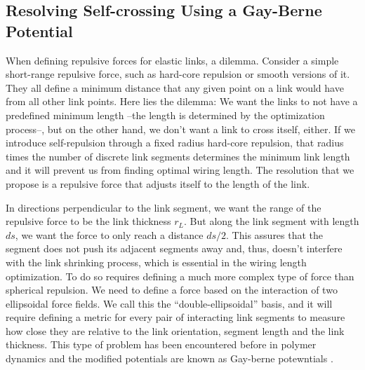 \documentclass[endfloats,nofootinbib,preprint,floatfix,titlepage,superscriptaddress]{revtex4} %
\begin{document}
\subsection{Resolving Self-crossing Using a Gay-Berne Potential \label{ap:gay-berne}}
When defining repulsive forces for elastic links,  a dilemma. 
Consider a simple short-range repulsive force, such as hard-core repulsion or smooth versions of it. 
They all define a minimum distance that any given point on a link would have from all other link points. 
Here lies the dilemma: 
We want the links to not have a predefined minimum length --the length is determined by the optimization process--, but on the other hand, we don't want a link to cross itself, either. 
If we introduce self-repulsion through a fixed radius hard-core repulsion, that radius times the number of discrete link segments determines the minimum link length and it will prevent us from finding optimal wiring length. 
The resolution that we propose is a repulsive force that adjusts itself to the length of the link. 

In directions perpendicular to the link segment, we want the range of the repulsive force to be the link thickness $r_L$. But along the link segment with length $ds$, we want the force to only reach a distance $ds/2$. 
This assures that the segment does not push its adjacent segments away and, thus, doesn't interfere with the link shrinking process, which is essential in the wiring length optimization.
To do so requires defining a much more complex type of force than spherical repulsion. 
We need to define a force based on the interaction of two ellipsoidal force fields. We call this the ``double-ellipsoidal'' basis, and it will require defining a metric for every pair of interacting link segments to measure how close they are relative to the link orientation, segment length and the link thickness. 
This type of problem has been encountered before in polymer dynamics and the modified potentials are known as Gay-berne potewntials \citep{berne1972gaussian,gay1981modification,babadi2006coarse}. 
\end{document}
